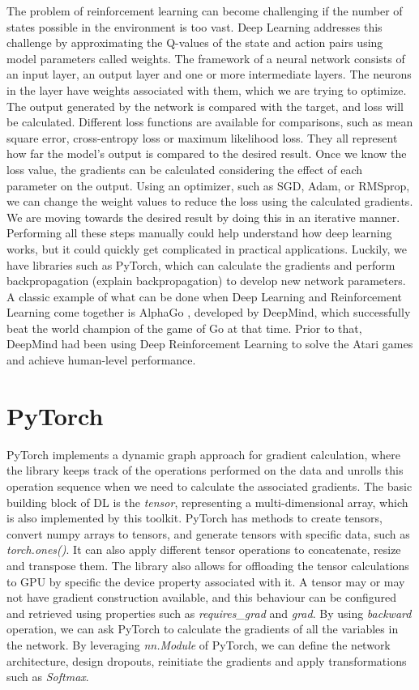 \documentclass[logo,msc]{infthesis}           %
\begin{document}
The problem of reinforcement learning can become challenging if the number of states possible in the environment is too vast. Deep Learning addresses this challenge by approximating the Q-values of the state and action pairs using model parameters called weights. The framework of a neural network consists of an input layer, an output layer and one or more intermediate layers. The neurons in the layer have weights associated with them, which we are trying to optimize. The output generated by the network is compared with the target, and loss will be calculated. Different loss functions are available for comparisons, such as mean square error, cross-entropy loss or maximum likelihood loss. They all represent how far the model's output is compared to the desired result. Once we know the loss value, the gradients can be calculated considering the effect of each parameter on the output. Using an optimizer, such as SGD, Adam, or RMSprop, we can change the weight values to reduce the loss using the calculated gradients. We are moving towards the desired result by doing this in an iterative manner. Performing all these steps manually could help understand how deep learning works, but it could quickly get complicated in practical applications. Luckily, we have libraries such as PyTorch, which can calculate the gradients and perform backpropagation (explain backpropagation) to develop new network parameters. A classic example of what can be done when Deep Learning and Reinforcement Learning come together is AlphaGo \cite{AlphaGo}, developed by DeepMind, which successfully beat the world champion of the game of Go at that time. Prior to that, DeepMind had been using Deep Reinforcement Learning to solve the Atari games and achieve human-level performance\cite {DeepMind}.

\section{PyTorch}

PyTorch implements a dynamic graph approach for gradient calculation, where the library keeps track of the operations performed on the data and unrolls this operation sequence when we need to calculate the associated gradients. The basic building block of DL is the \textit{tensor}, representing a multi-dimensional array, which is also implemented by this toolkit. PyTorch has methods to create tensors, convert numpy arrays to tensors, and generate tensors with specific data, such as \textit{torch.ones()}. It can also apply different tensor operations to concatenate, resize and transpose them. The library also allows for offloading the tensor calculations to GPU by specific the \textit{}device property associated with it. A tensor may or may not have gradient construction available, and this behaviour can be configured and retrieved using properties such as \textit{requires\_grad} and \textit{grad}. By using \textit{backward} operation, we can ask PyTorch to calculate the gradients of all the variables in the network. By leveraging \textit{nn.Module} of PyTorch, we can define the network architecture, design dropouts, reinitiate the gradients and apply transformations such as \textit{Softmax}.
\end{document}

